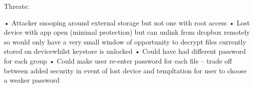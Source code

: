 Threats:

•	Attacker snooping around external storage but not one with root access
•	Lost device with app open (minimal protection) but can unlink from dropbox remotely so would only have a very small window of opportunity to decrypt files currently stored on devicewhilst keystore is unlocked
•	Could have had different password for each group
•	Could make user re-enter password for each file – trade off between added security in event of lost device and templtation for user to choose a weaker password











